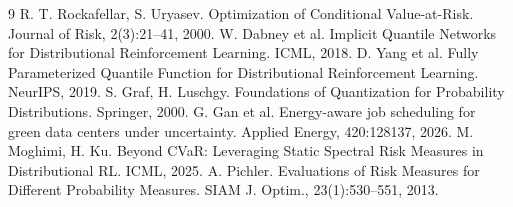 \documentclass[a4paper,twocolumn,10pt]{jsarticle}
\begin{document}
\begin{thebibliography}{9}
\footnotesize
\setlength{\itemsep}{0pt}
\setlength{\parskip}{0pt}
 R. T. Rockafellar, S. Uryasev. Optimization of Conditional Value-at-Risk. Journal of Risk, 2(3):21--41, 2000.
 W. Dabney et al. Implicit Quantile Networks for Distributional Reinforcement Learning. ICML, 2018.
 D. Yang et al. Fully Parameterized Quantile Function for Distributional Reinforcement Learning. NeurIPS, 2019.
 S. Graf, H. Luschgy. Foundations of Quantization for Probability Distributions. Springer, 2000.
 G. Gan et al. Energy-aware job scheduling for green data centers under uncertainty. Applied Energy, 420:128137, 2026.
 M. Moghimi, H. Ku. Beyond CVaR: Leveraging Static Spectral Risk Measures in Distributional RL. ICML, 2025.
 A. Pichler. Evaluations of Risk Measures for Different Probability Measures. SIAM J. Optim., 23(1):530--551, 2013.
\end{thebibliography}
\end{document}
